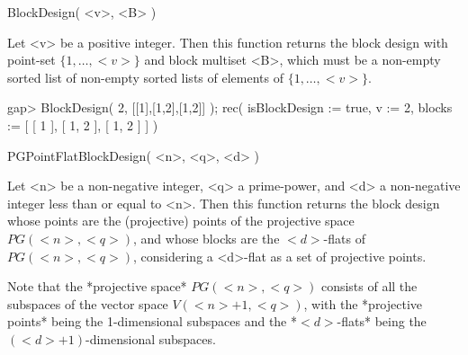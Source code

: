 %
%
%
%
\def\DESIGN{\sf DESIGN}
\def\GRAPE{\sf GRAPE}
\def\nauty{\it nauty}
\def\Aut{{\rm Aut}\,}
\def\x{\times}


\>BlockDesign( <v>, <B> )

Let <v> be a positive integer. Then this function  returns the block
design with point-set $\{1,\ldots,<v>\}$ and block multiset <B>, which
must be a non-empty sorted list of non-empty sorted lists of elements
of $\{1,\ldots,<v>\}$.

\beginexample
gap> BlockDesign( 2, [[1],[1,2],[1,2]] );
rec( isBlockDesign := true, v := 2, blocks := [ [ 1 ], [ 1, 2 ], [ 1, 2 ] ] )
\endexample



\>PGPointFlatBlockDesign( <n>, <q>, <d> )

Let <n> be a non-negative integer, <q> a prime-power, and <d> a
non-negative integer less than or equal to <n>. Then this function
returns the block design whose points are the (projective) points of
the projective space $PG(<n>,<q>)$, and whose blocks are the $<d>$-flats
of $PG(<n>,<q>)$, considering a <d>-flat as a set of projective points.

Note that the *projective space* $PG(<n>,<q>)$ consists of all the
subspaces of the vector space $V(<n>+1,<q>)$, with the *projective
points* being the 1-dimensional subspaces and the *$<d>$-flats* being
the $(<d>+1)$-dimensional subspaces.

